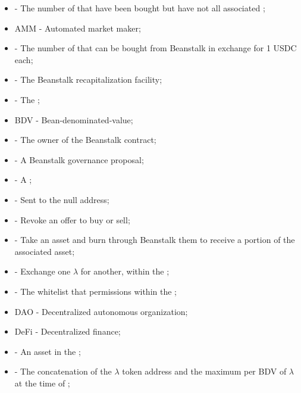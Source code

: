 \documentclass[class=article, crop=false]{standalone}
\begin{document}
\begin{itemize}[topsep=0pt, itemsep=3pt,leftmargin=16pt]
    \item[]  - \hypertarget{ht13}{The number of  that have been bought but have not  all associated };
    \item[] AMM - \hypertarget{ht14}{Automated market maker};
    \item[]  - \hypertarget{ht15}{The number of  that can be bought from Beanstalk in exchange for 1 USDC each};
    \item[]  - \hypertarget{ht18}{The Beanstalk recapitalization facility};
    \item[]  - \hypertarget{ht19}{The };
    \item[] BDV - \hypertarget{ht20}{Bean-denominated-value};
    \item[]  - \hypertarget{ht21}{The owner of the Beanstalk contract};
    \item[]  - \hypertarget{ht22}{A Beanstalk governance proposal};
    \item[]  - \hypertarget{ht23}{A };
    \item[]  - \hypertarget{ht24}{Sent to the null address};
    \item[]  - \hypertarget{ht34}{Revoke an offer to buy or sell};
    \item[]  - \hypertarget{ht35}{Take an  asset and burn through Beanstalk them to receive a portion of the associated  asset};
    \item[]  - \hypertarget{ht36}{Exchange one  $\lambda$ for another, within the };
    \item[]  - \hypertarget{ht37}{The whitelist that permissions  within the };
    \item[] DAO - \hypertarget{ht43}{Decentralized autonomous organization};
    \item[] DeFi - \hypertarget{ht44}{Decentralized finance};
    \item[]  - \hypertarget{ht45}{An asset in the };
    \item[]  - The concatenation of the \hyperlink{ht126}{$\lambda$} token address and the maximum   per BDV of \hyperlink{ht126}{$\lambda$} at the time of ;

\end{itemize}
\end{document}
